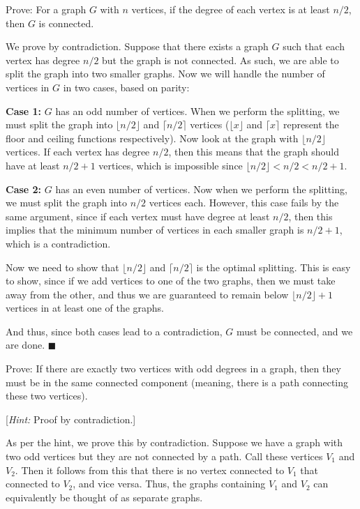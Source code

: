\documentclass[11pt]{article}
\begin{document}
\begin{Parts}
    \Part Prove: For a graph $G$ with $n$ vertices, if the degree of each vertex is at least $n/2$, then $G$ is connected. 

    \begin{solution}
        We prove by contradiction. Suppose that there exists a graph $G$ such that each vertex has degree $n/2$ but the graph is not connected. As such, we are able to split the graph into two smaller graphs. Now we will handle the number of vertices in $G$ in two cases, based on parity: 

        \textbf{Case 1:} $G$ has an odd number of vertices. When we perform the splitting, we must split the graph into $\lfloor n/2 \rfloor$ and $\lceil n/2 \rceil$ vertices ($\lfloor x \rfloor$ and $\lceil x\rceil$ represent the floor and ceiling functions respectively). Now look at the graph with $\lfloor n/2\rfloor$ vertices. If each vertex has degree $n/2$, then this means that the graph should have at least $n/2+1$ vertices, which is impossible since $\lfloor n/2\rfloor < n/2 < n/2 + 1$.

        \textbf{Case 2:} $G$ has an even number of vertices. Now when we perform the splitting, we must split the graph into $n/2$ vertices each. However, this case fails by the same argument, since if each vertex must have degree at least $n/2$, then this implies that the minimum number of vertices in each smaller graph is $n/2+1$, which is a contradiction. 

        Now we need to show that $\lfloor n/2 \rfloor$ and $\lceil n/2 \rceil$ is the optimal splitting. This is easy to show, since if we add vertices to one of the two graphs, then we must take away from the other, and thus we are guaranteed to remain below $\lfloor n/2 \rfloor +1$ vertices in at least one of the graphs. 
        
        And thus, since both cases lead to a contradiction, $G$ must be connected, and we are done. $\blacksquare$
    \end{solution}
    
    \Part Prove: If there are exactly two vertices with odd degrees in a graph, then they must be in the same connected component (meaning, there is a path connecting these two vertices). 
    
    [\textit{Hint:} Proof by contradiction.]

    \begin{solution}
        As per the hint, we prove this by contradiction. Suppose we have a graph with two odd vertices but they are not connected by a path. Call these vertices $V_1$ and $V_2$. Then it follows from this that there is no vertex connected to $V_1$ that connected to $V_2$, and vice versa. Thus, the graphs containing $V_1$ and $V_2$ can equivalently be thought of as separate graphs. 


\end{solution}
\end{Parts}
\end{document}
